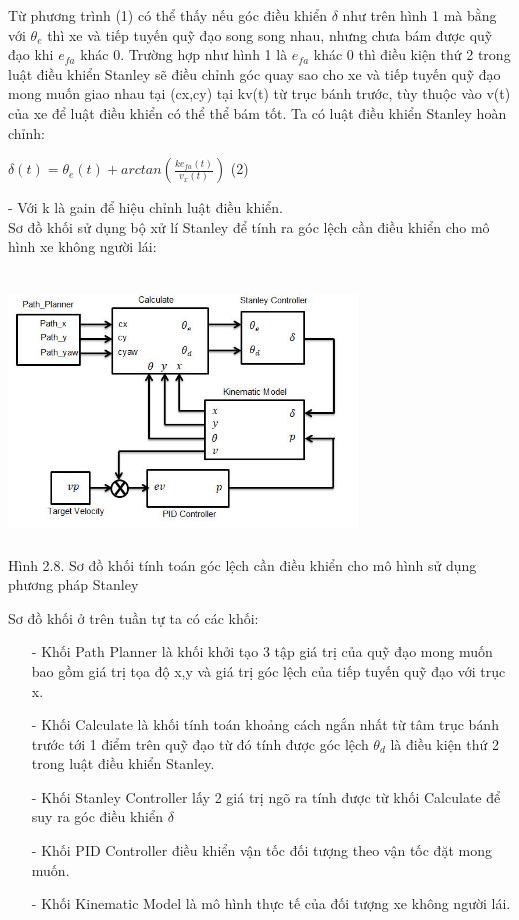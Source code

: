 \documentclass[a4paper, 12pt]{article}
\begin{document}
\hspace{0.5cm}
Từ phương trình (1) có thể thấy nếu góc điều khiển $\delta$ như trên hình 1 mà bằng với $\theta_{e}$ thì xe và tiếp tuyến quỹ đạo song song nhau, nhưng chưa bám được quỹ đạo khi $e_{fa}$ khác 0. Trường hợp như hình 1 là $e_{fa}$ khác 0 thì điều kiện thứ 2 trong luật điều khiển Stanley sẽ điều chỉnh góc quay sao cho xe và tiếp tuyến quỹ đạo mong muốn giao nhau tại (cx,cy) tại kv(t) từ trục bánh trước, tùy thuộc vào v(t) của xe để luật điều khiển có thể thể bám tốt. Ta có luật điều khiển Stanley hoàn chỉnh:\\
\begin{center}
	$\delta(t) = \theta_{e}(t) + arctan(\frac{ke_{fa}(t)}{v_{x}(t)})$ (2)
\end{center}
- Với k là gain để hiệu chỉnh luật điều khiển.\\
\indent
Sơ đồ khối sử dụng bộ xử lí Stanley để tính ra góc lệch cần điều khiển cho mô hình xe không người lái:
\begin{center}
	\includegraphics[width=350px,height=280px]{images/SoDoKhoiStanley}\\
	Hình 2.8. Sơ đồ khối tính toán góc lệch cần điều khiển cho mô hình sử dụng phương pháp Stanley
\end{center}
\hspace{0.5cm}
Sơ đồ khối ở trên tuần tự ta có các khối:\\
\begin{enumerate}
	\item[-] Khối Path Planner là khối khởi tạo 3 tập giá trị của quỹ đạo mong muốn bao gồm giá trị tọa độ x,y và giá trị góc lệch của tiếp tuyến quỹ đạo với trục x. 
	\item[-] Khối Calculate là khối tính toán khoảng cách ngắn nhất từ tâm trục bánh trước tới 1 điểm trên quỹ đạo từ đó tính được góc lệch $\theta_{d}$  là điều kiện thứ 2 trong luật điều khiển Stanley.
	\item[-] Khối Stanley Controller lấy 2 giá trị ngõ ra tính được từ khối Calculate để suy ra góc điều khiển $\delta$
	\item[-] Khối PID Controller điều khiển vận tốc đối tượng theo vận tốc đặt mong muốn.
	\item[-] Khối Kinematic Model là mô hình thực tế của đối tượng xe không người lái.
\end{enumerate}
\end{document}
